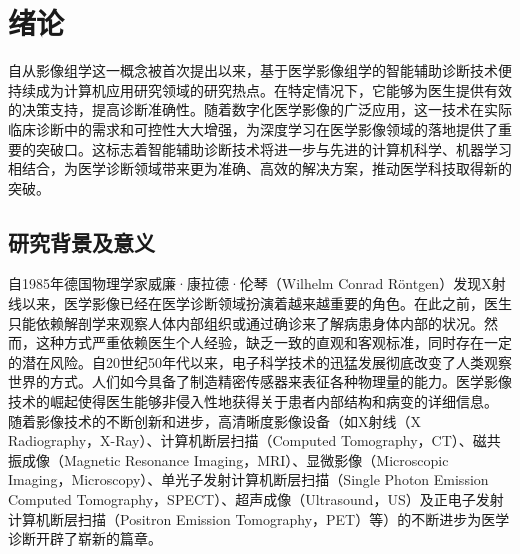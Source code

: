 \chapter{绪论} 
\label{chapter:Introduction}
自从影像组学这一概念被首次提出以来\cite{lambin2012radiomics}，基于医学影像组学的智能辅助诊断技术便持续成为计算机应用研究领域的研究热点\cite{lambin2012radiomics,lo2019computer}。在特定情况下，它能够为医生提供有效的决策支持，提高诊断准确性。随着数字化医学影像的广泛应用，这一技术在实际临床诊断中的需求和可控性大大增强，为深度学习在医学影像领域的落地提供了重要的突破口。这标志着智能辅助诊断技术将进一步与先进的计算机科学、机器学习相结合，为医学诊断领域带来更为准确、高效的解决方案，推动医学科技取得新的突破。

\section{研究背景及意义}
自1985年德国物理学家威廉·康拉德·伦琴（Wilhelm Conrad Röntgen）发现X射线以来\cite{bunaciu2015x}，医学影像已经在医学诊断领域扮演着越来越重要的角色。在此之前，医生只能依赖解剖学来观察人体内部组织或通过确诊来了解病患身体内部的状况。然而，这种方式严重依赖医生个人经验，缺乏一致的直观和客观标准，同时存在一定的潜在风险。自20世纪50年代以来，电子科学技术的迅猛发展彻底改变了人类观察世界的方式。人们如今具备了制造精密传感器来表征各种物理量的能力。医学影像技术的崛起使得医生能够非侵入性地获得关于患者内部结构和病变的详细信息。
随着影像技术的不断创新和进步，高清晰度影像设备（如X射线（X Radiography，X-Ray）\cite{warren1990x}、计算机断层扫描（Computed Tomography，CT）\cite{boyd1983cardiac}、磁共振成像（Magnetic Resonance Imaging，MRI）\cite{young1984nuclear}、显微影像（Microscopic Imaging，Microscopy）\cite{haider1998electron}、单光子发射计算机断层扫描（Single Photon Emission Computed Tomography，SPECT）\cite{jaszczak1980spect}、超声成像（Ultrasound，US）\cite{newman1998history}及正电子发射计算机断层扫描（Positron Emission Tomography，PET）\cite{raichle1983positron}等）的不断进步为医学诊断开辟了崭新的篇章。


